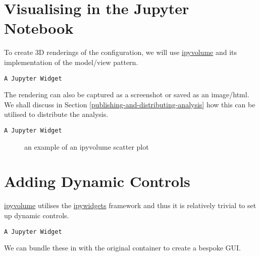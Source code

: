 \documentclass[10pt,parskip=half,
	toc=sectionentrywithdots,
	bibliography=totocnumbered,
	captions=tableheading,numbers=noendperiod]{scrartcl}
\begin{document}
\section{Visualising in the Jupyter
Notebook}\label{visualising-in-the-jupyter-notebook}

To create 3D renderings of the configuration, we will use
\href{http://ipyvolume.readthedocs.io}{ipyvolume} and its implementation
of the model/view pattern.

\begin{lstlisting}[language={},postbreak={},numbers=none,xrightmargin=7pt,breakindent=0pt,aboveskip=5pt,belowskip=5pt]
A Jupyter Widget
\end{lstlisting}

The rendering can also be captured as a screenshot or saved as an
image/html. We shall discuss in
Section \ref{publishing-and-distributing-analysis} how this can be
utilised to distribute the analysis.

\begin{lstlisting}[language={},postbreak={},numbers=none,xrightmargin=7pt,breakindent=0pt,aboveskip=5pt,belowskip=5pt]
A Jupyter Widget
\end{lstlisting}

\begin{figure}[H]\begin{center}\end{center}\caption{an example of an ipyvolume scatter plot}\label{fig:ipyvol1}
    \end{figure}

\section{Adding Dynamic Controls}\label{adding-dynamic-controls}

\href{http://ipyvolume.readthedocs.io}{ipyvolume} utilises the
\href{http://ipywidgets.readthedocs.io}{ipywidgets} framework and thus
it is relatively trivial to set up dynamic controls.

\begin{lstlisting}[language={},postbreak={},numbers=none,xrightmargin=7pt,breakindent=0pt,aboveskip=5pt,belowskip=5pt]
A Jupyter Widget
\end{lstlisting}

We can bundle these in with the original container to create a bespoke
GUI.
\end{document}

